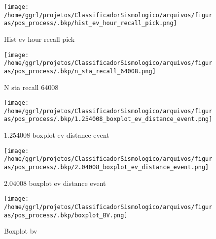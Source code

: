                     \begin{figure}[H]
                        \centering
                        \texttt{[image: /home/ggrl/projetos/ClassificadorSismologico/arquivos/figuras/pos\_process/.bkp/hist\_ev\_hour\_recall\_pick.png]}
                        \caption{Hist ev hour recall pick}
                        \label{fig:hist_ev_hour_recall_pick}
                    \end{figure}
                

                    \begin{figure}[H]
                        \centering
                        \texttt{[image: /home/ggrl/projetos/ClassificadorSismologico/arquivos/figuras/pos\_process/.bkp/n\_sta\_recall\_64008.png]}
                        \caption{N sta recall 64008}
                        \label{fig:n_sta_recall_64008}
                    \end{figure}
                

                    \begin{figure}[H]
                        \centering
                        \texttt{[image: /home/ggrl/projetos/ClassificadorSismologico/arquivos/figuras/pos\_process/.bkp/1.254008\_boxplot\_ev\_distance\_event.png]}
                        \caption{1.254008 boxplot ev distance event}
                        \label{fig:1.254008_boxplot_ev_distance_event}
                    \end{figure}
                

                    \begin{figure}[H]
                        \centering
                        \texttt{[image: /home/ggrl/projetos/ClassificadorSismologico/arquivos/figuras/pos\_process/.bkp/2.04008\_boxplot\_ev\_distance\_event.png]}
                        \caption{2.04008 boxplot ev distance event}
                        \label{fig:2.04008_boxplot_ev_distance_event}
                    \end{figure}
                

                    \begin{figure}[H]
                        \centering
                        \texttt{[image: /home/ggrl/projetos/ClassificadorSismologico/arquivos/figuras/pos\_process/.bkp/boxplot\_BV.png]}
                        \caption{Boxplot bv}
                        \label{fig:boxplot_BV}
                    \end{figure}
                

